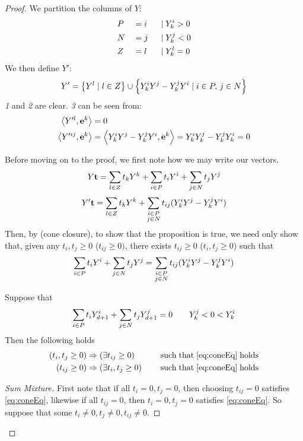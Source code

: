 \begin{proof}
	We partition the columns of $ Y$:
	\begin{alignat*}{3}
		 & P &  & = i \; & \;|\; & Y^i_{k} > 0 \\
		 & N &  & = j \; & \;|\; & Y^j_{k} < 0 \\
		 & Z &  & = l \; & \;|\; & Y^l_{k} = 0
	\end{alignat*}
	We then define $ Y'$:
	\[  Y' = \left\{ Y^l \;|\; l \in Z\right\} \cup
		\left\{Y^i_{k} Y^j - Y^j_{k} Y^i \;|\; i \in P,\, j\in N\right\} \]
	\textit{1} and \textit{2} are clear.  \textit{3} can be seen from:
	\begin{align}
		\left\langle Y'^l, \mathbf{e}^k \right\rangle    & = 0 \nonumber                                                                \\
		\left\langle Y'^{ij}, \mathbf{e}^k \right\rangle & = \left\langle Y^i_{k} Y^j - Y^j_{k} Y^i, \mathbf{e}^k \right\rangle = Y^i_{k} Y^j_{k} - Y^j_{k} Y^i_{k} = 0 \label{eq:hdropZrows}
	\end{align}

	Before moving on to the proof, we first note how we may write our vectors.
	\[  Y\mathbf{t} = \sum_{l\in Z} t_k  Y^k + \sum_{i\in P} t_i  Y^i + \sum_{j\in N} t_j  Y^j \]
	\[  Y'\mathbf{t} = \sum_{l\in Z} t_k  Y^k + \sum_{\substack{i\in P \\ j\in N}} t_{ij} (Y^i_{k} Y^j - Y^j_{k} Y^i) \]
	Then, by  (cone closure), to show that the proposition is true, we need only show that, given any $t_i, t_j \geq 0$ ($t_{ij} \geq 0)$, there exists $t_{ij} \geq 0$ ($t_i, t_j \geq 0$) such that
	\begin{equation} \label{eq:coneEq}
		\sum_{i\in P} t_i  Y^i + \sum_{j\in N} t_j  Y^j = \sum_{\substack{i\in P \\ j\in N}} t_{ij} (Y^i_{k} Y^j - Y^j_{k} Y^i)
	\end{equation}

	\newcommand{\coneEqSat}{\quad\mathrm{\;such\; that\; \eqref{eq:coneEq}\; holds}}
	\begin{Prop}
		Suppose that
		\[ \sum_{i\in P} t_i  Y^i_{d+1} + \sum_{j\in N} t_j  Y^j_{d+1} = 0\quad\quad Y^j_{k} < 0 < Y^i_{k} \]
		Then the following holds
		\begin{alignat*}{2}
			(t_i, t_j \geq 0) & \Rightarrow (\exists t_{ij} \geq 0)   &  & \coneEqSat \\
			(t_{ij} \geq 0)   & \Rightarrow (\exists t_i, t_j \geq 0) &  & \coneEqSat
		\end{alignat*}
	\end{Prop}

	\begin{proof}[Sum Mixture]
		First note that if all $t_i = 0,t_j = 0$, then choosing $t_{ij} = 0$ satisfies \eqref{eq:coneEq}, likewise if all $t_{ij} = 0$, then $t_i = 0, t_j = 0$ satisfies \eqref{eq:coneEq}.  So suppose that some $t_i \neq 0, t_j \neq 0, t_{ij} \neq 0$.


\end{proof}
\end{proof}
